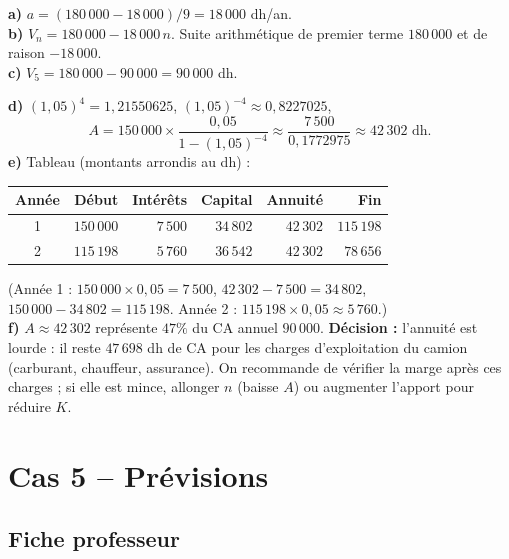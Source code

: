 \documentclass[12pt,a4paper]{article}
\begin{document}
\begin{corrigebox}
\textbf{a)} $a=(180\,000-18\,000)/9=18\,000$ dh/an.\\
\textbf{b)} $V_n=180\,000-18\,000\,n$. Suite arithmétique de premier terme $180\,000$ et de raison $-18\,000$.\\
\textbf{c)} $V_5=180\,000-90\,000=90\,000$ dh.
\end{corrigebox}

\begin{corrigebox}
\textbf{d)} $(1{,}05)^4=1{,}21550625$, $(1{,}05)^{-4}\approx 0{,}8227025$,
$$A=150\,000\times\frac{0{,}05}{1-(1{,}05)^{-4}} \approx \frac{7\,500}{0{,}1772975} \approx 42\,302 \text{ dh.}$$
\textbf{e)} Tableau (montants arrondis au dh) :
\begin{center}
\small
\begin{tabular}{crrrrr}
\toprule
Année & Début & Intérêts & Capital & Annuité & Fin \\
\midrule
1 & $150\,000$ & $7\,500$ & $34\,802$ & $42\,302$ & $115\,198$ \\
2 & $115\,198$ & $5\,760$ & $36\,542$ & $42\,302$ & $78\,656$ \\
\bottomrule
\end{tabular}
\end{center}
(Année 1 : $150\,000\times 0{,}05=7\,500$, $42\,302-7\,500=34\,802$, $150\,000-34\,802=115\,198$. Année 2 : $115\,198\times 0{,}05\approx 5\,760$.)\\
\textbf{f)} $A\approx 42\,302$ représente $47\%$ du CA annuel $90\,000$. \textbf{Décision :} l'annuité est lourde : il reste $47\,698$ dh de CA pour les charges d'exploitation du camion (carburant, chauffeur, assurance). On recommande de vérifier la marge après ces charges ; si elle est mince, allonger $n$ (baisse $A$) ou augmenter l'apport pour réduire $K$.
\end{corrigebox}

\section{Cas 5 -- Prévisions}

\subsection{Fiche professeur}
\end{document}
